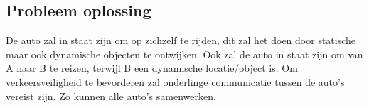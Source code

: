 \subsection{Probleem oplossing}
De auto zal in staat zijn om op zichzelf te rijden, dit zal het doen door statische maar ook dynamische objecten te ontwijken. 
Ook zal de auto in staat zijn om van A naar B te reizen, terwijl B een dynamische locatie/object is.
Om verkeersveiligheid te bevorderen zal onderlinge communicatie tussen de auto's vereist zijn. Zo kunnen alle auto's samenwerken.